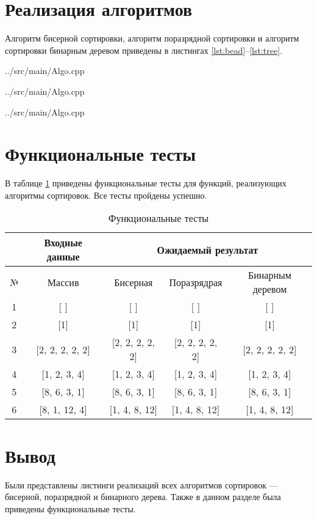 \section{Реализация алгоритмов}
Алгоритм бисерной сортировки, алгоритм поразрядной сортировки и алгоритм сортировки бинарным деревом приведены в листингах \ref{lst:bead}--\ref{lst:tree}.

\begin{lstinputlisting}[
	caption={Алгоритм бисерной сортировки},
	label={lst:bead},
	linerange={29-48}
	]{../src/main/Algo.cpp}
\end{lstinputlisting}

\begin{lstinputlisting}[
	caption={Алгоритм поразрядной сортировки},
	label={lst:radix},
	linerange={50-72}
	]{../src/main/Algo.cpp}
\end{lstinputlisting}

\begin{lstinputlisting}[
	caption={Алгоритм сортировки бинарным деревом},
	label={lst:tree},
	linerange={88-119}
	]{../src/main/Algo.cpp}
\end{lstinputlisting}

\clearpage




\section{Функциональные тесты}

В таблице \ref{tbl:tests} приведены функциональные тесты для функций, реализующих алгоритмы сортировок. Все тесты пройдены успешно.

\begin{table}[h]
	\begin{center}
        \begin{threeparttable}
        \captionsetup{justification=raggedright,singlelinecheck=off}
		\caption{\label{tbl:tests} Функциональные тесты}
		\begin{tabular}{|c|c|c|c|c|}
			\hline
			&Входные данные& \multicolumn{3}{c|}{Ожидаемый результат} \\
			\hline
			№&Массив&Бисерная&Поразрядрая&Бинарным деревом \\
			\hline
            1&[ ]&[ ]&[ ]&[ ] \\
            \hline
            2&[1]&[1]&[1]&[1] \\
            \hline
            3&[2, 2, 2, 2, 2]&[2, 2, 2, 2, 2]&[2, 2, 2, 2, 2]&[2, 2, 2, 2, 2] \\
            \hline
            4&[1, 2, 3, 4]&[1, 2, 3, 4]&[1, 2, 3, 4]&[1, 2, 3, 4] \\
			\hline
			5&[8, 6, 3, 1]&[8, 6, 3, 1]&[8, 6, 3, 1]&[8, 6, 3, 1] \\
			\hline
            6&[8, 1, 12, 4]&[1, 4, 8, 12]&[1, 4, 8, 12]&[1, 4, 8, 12] \\
			\hline
		\end{tabular}
        \end{threeparttable}
	\end{center}
\end{table}

\section*{Вывод}

Были представлены листинги реализаций всех алгоритмов сортировок --- бисерной, поразрядной и бинарного дерева. Также в данном разделе была приведены функциональные тесты.